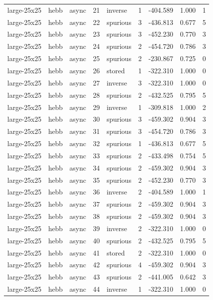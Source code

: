 \begin{tabular}{lllrlrrrr}
large-25x25 & hebb & async & 21 & inverse & 1 & -404.589 & 1.000 & 1 \\
large-25x25 & hebb & async & 22 & spurious & 3 & -436.813 & 0.677 & 5 \\
large-25x25 & hebb & async & 23 & spurious & 3 & -452.230 & 0.770 & 3 \\
large-25x25 & hebb & async & 24 & spurious & 2 & -454.720 & 0.786 & 3 \\
large-25x25 & hebb & async & 25 & spurious & 2 & -230.867 & 0.725 & 0 \\
large-25x25 & hebb & async & 26 & stored & 1 & -322.310 & 1.000 & 0 \\
large-25x25 & hebb & async & 27 & inverse & 3 & -322.310 & 1.000 & 0 \\
large-25x25 & hebb & async & 28 & spurious & 2 & -432.525 & 0.795 & 5 \\
large-25x25 & hebb & async & 29 & inverse & 1 & -309.818 & 1.000 & 2 \\
large-25x25 & hebb & async & 30 & spurious & 3 & -459.302 & 0.904 & 3 \\
large-25x25 & hebb & async & 31 & spurious & 3 & -454.720 & 0.786 & 3 \\
large-25x25 & hebb & async & 32 & spurious & 1 & -436.813 & 0.677 & 5 \\
large-25x25 & hebb & async & 33 & spurious & 2 & -433.498 & 0.754 & 5 \\
large-25x25 & hebb & async & 34 & spurious & 2 & -459.302 & 0.904 & 3 \\
large-25x25 & hebb & async & 35 & spurious & 2 & -452.230 & 0.770 & 3 \\
large-25x25 & hebb & async & 36 & inverse & 2 & -404.589 & 1.000 & 1 \\
large-25x25 & hebb & async & 37 & spurious & 2 & -459.302 & 0.904 & 3 \\
large-25x25 & hebb & async & 38 & spurious & 2 & -459.302 & 0.904 & 3 \\
large-25x25 & hebb & async & 39 & inverse & 2 & -322.310 & 1.000 & 0 \\
large-25x25 & hebb & async & 40 & spurious & 2 & -432.525 & 0.795 & 5 \\
large-25x25 & hebb & async & 41 & stored & 2 & -322.310 & 1.000 & 0 \\
large-25x25 & hebb & async & 42 & spurious & 4 & -459.302 & 0.904 & 3 \\
large-25x25 & hebb & async & 43 & spurious & 2 & -441.005 & 0.642 & 3 \\
large-25x25 & hebb & async & 44 & inverse & 1 & -322.310 & 1.000 & 0 \\

\end{tabular}
